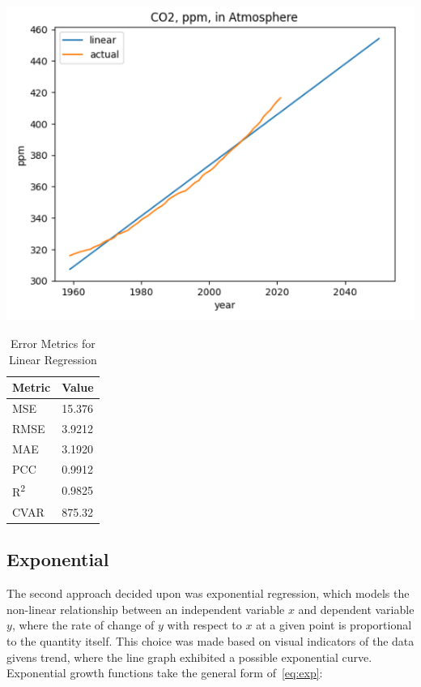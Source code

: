 \documentclass{mcmthesis}
\begin{document}
    \begin{table}[h]
        \begin{minipage}{0.7\linewidth}
            \centering
            \includegraphics[width=\textwidth]{linear}%
            \label{fig:co2_lr}
        \end{minipage}%
        \begin{minipage}{0.3\linewidth}
            \centering
            \begin{tabular}{ll}
                \toprule
                Metric               & Value  \\
                \midrule
                MSE                  & 15.376 \\
                RMSE                 & 3.9212 \\
                MAE                  & 3.1920 \\
                PCC                  & 0.9912 \\
                R\textsuperscript{2} & 0.9825 \\
                CVAR                 & 875.32 \\
                \bottomrule
            \end{tabular}
            \caption{Error Metrics for Linear Regression}
            \label{tab:co2_lr_err}
        \end{minipage}
    \end{table}

    \subsection{Exponential}
    The second approach decided upon was exponential regression, which models the non-linear relationship between an independent variable $x$ and dependent variable $y$, where the rate of change of $y$ with respect to $x$ at a given point is proportional to the quantity itself.
    This choice was made based on visual indicators of the data given\textquotesingle s trend, where the line graph exhibited a possible exponential curve.
    Exponential growth functions take the general form of~\eqref{eq:exp}:
\end{document}
